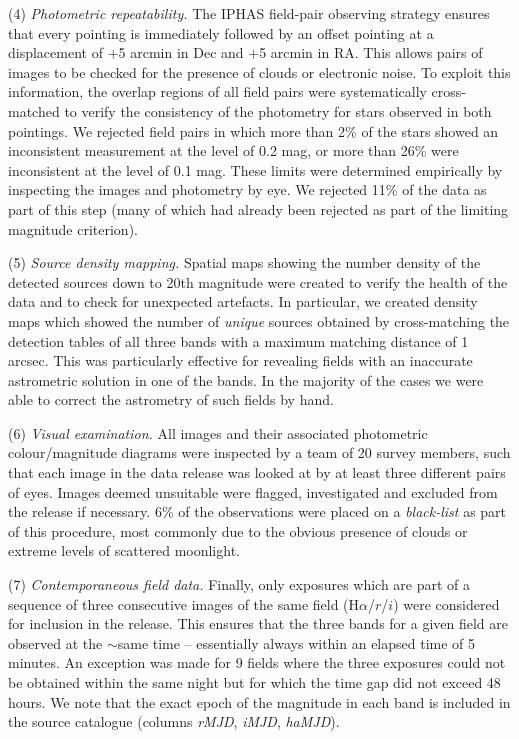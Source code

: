 \documentclass[useAMS,usenatbib]{mn2e}
\begin{document}
(4) \emph{Photometric repeatability.} 
The IPHAS field-pair observing strategy 
ensures that every pointing is immediately followed 
by an offset pointing at a displacement of $+$5 arcmin in Dec 
and $+$5 arcmin in RA.
This allows pairs of images to be checked 
for the presence of clouds or electronic noise.
To exploit this information,
the overlap regions of all field pairs were systematically cross-matched
to verify the consistency of the photometry
for stars observed in both pointings.
We rejected field pairs in which more than 2\% of the stars 
showed an inconsistent measurement at the level of 0.2 mag,
or more than 26\% were inconsistent at the level of 0.1 mag.
These limits were determined empirically by inspecting
the images and photometry by eye.
We rejected 11\% of the data as part of this step
(many of which had already been rejected as part of the limiting magnitude criterion).

(5) \emph{Source density mapping.}
Spatial maps showing the number density of the detected sources
down to 20th magnitude were created to verify the health
of the data and to check for unexpected artefacts.
In particular, we created density maps
which showed the number of \emph{unique} sources
obtained by cross-matching the detection tables of
all three bands with a maximum matching distance of 1 arcsec.
This was particularly effective for revealing
fields with an inaccurate astrometric solution in one of the bands.
In the majority of the cases we were able to correct the astrometry
of such fields by hand.

(6) \emph{Visual examination.}
All images and their associated photometric colour/magnitude diagrams
were inspected by a team of 20 survey members, 
such that each image in the data release 
was looked at by at least three different pairs of eyes.
Images deemed unsuitable were flagged, investigated and
excluded from the release if necessary. 
6\% of the observations were placed on a \emph{black-list}
as part of this procedure, most commonly due to the obvious presence
of clouds or extreme levels of scattered moonlight.

(7) \emph{Contemporaneous field data.} 
Finally, only exposures which are part of a sequence 
of three consecutive images of the same field (H$\alpha$/$r$/$i$) 
were considered for inclusion in the release. 
This ensures that the three bands for a given field
are observed at the $\sim$same time --  
essentially always within an elapsed time of 5 minutes.
An exception was made for 9 fields where the three exposures 
could not be obtained within the same night
but for which the time gap did not exceed 48 hours.
We note that the exact epoch of the magnitude in each band
is included in the source catalogue
(columns \emph{rMJD}, \emph{iMJD}, \emph{haMJD}).
\end{document}
